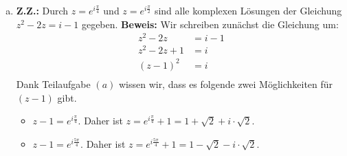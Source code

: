 \documentclass{article}
\begin{document}
\begin{enumerate}[(a)]
	\item \textbf{Z.Z.:} Durch $z = e^{i\frac{\pi}{4}}$ und $z = e^{i\frac{\pi}{2}}$ sind alle komplexen Lösungen der Gleichung $z^2 -2z = i - 1$ gegeben.
	\textbf{Beweis:} Wir schreiben zunächst die Gleichung um:
	\begin{align*}
	z^2 - 2z &= i-1\\
	z^2 - 2z + 1 &=i\\
	(z-1)^2 &= i\\
	\end{align*}
	Dank Teilaufgabe $(a)$ wissen wir, dass es folgende zwei Möglichkeiten für $(z-1)$ gibt.
	\begin{itemize}
		\item $z-1 = e^{i\frac{\pi}{4}}$. Daher ist $z = e^{i\frac{\pi}{4}} +1 = 1 + \sqrt{2} + i\cdot \sqrt{2}$.
		\item $z-1 = e^{i\frac{5\pi}{4}}$. Daher ist $z = e^{i\frac{5\pi}{4}} + 1 = 1 - \sqrt{2} - i\cdot \sqrt{2}$.
	\end{itemize}
\end{enumerate}
\end{document}
